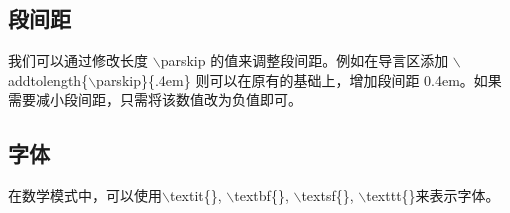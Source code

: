 \documentclass[12pt, a4paper, oneside, UTF8]{ctexart}
\begin{document}
\subsection{段间距}
我们可以通过修改长度 $\backslash$parskip 的值来调整段间距。例如在导言区添加
$\backslash$addtolength\{$\backslash$parskip\}\{.4em\}
则可以在原有的基础上，增加段间距 0.4em。如果需要减小段间距，只需将该数值改为负值即可。
\subsection{字体}
在数学模式中，可以使用$\backslash$textit\{\}, $\backslash$textbf\{\}, 
$\backslash$textsf\{\}, $\backslash$texttt\{\}来表示字体。
\newpage
{}

\end{document}
